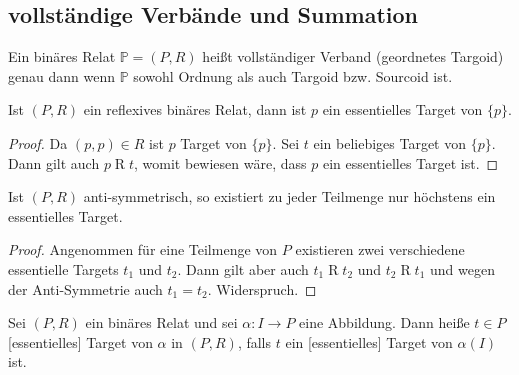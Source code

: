 \documentclass{article}
\begin{document}
\subsection{vollständige Verbände und Summation}

\begin{definition}
  Ein binäres Relat $\mathbb{P} = (P, R)$ heißt vollständiger Verband (geordnetes Targoid) genau dann wenn 
  $\mathbb{P}$ sowohl Ordnung als auch Targoid bzw. Sourcoid ist.
\end{definition}

\begin{theorem}\label{Theorem_ReflexivesRelat}
  Ist $(P, R)$ ein reflexives binäres Relat, 
  dann ist $p$ ein essentielles Target von $\{p\}$.
\end{theorem}
\begin{proof}
  Da $(p, p) \in R$ ist $p$ Target von $\{p\}$.
  Sei $t$ ein beliebiges Target von $\{p\}$.
  Dann gilt auch $p \mathrel{R} t$, womit bewiesen wäre, dass $p$ ein essentielles Target ist.
\end{proof}

\begin{theorem}\label{Theorem_AntisymmetrischesRelat}
  Ist $(P, R)$ anti-symmetrisch, so existiert zu jeder Teilmenge nur höchstens ein essentielles Target.
\end{theorem}
\begin{proof}
  Angenommen für eine Teilmenge von $P$ existieren zwei verschiedene essentielle Targets $t_1$ und $t_2$.
  Dann gilt aber auch $t_1 \mathrel{R} t_2$ und $t_2 \mathrel{R} t_1$ und wegen der 
  Anti-Symmetrie auch $t_1 = t_2$. Widerspruch.
\end{proof}

\begin{definition}
  Sei $(P, R)$ ein binäres Relat und sei $\alpha \colon I \to P$ eine Abbildung.
  Dann heiße $t \in P$ [essentielles] Target von $\alpha$ in $(P, R)$,
  falls $t$ ein [essentielles] Target von $\alpha(I)$ ist.
\end{definition}
\end{document}
